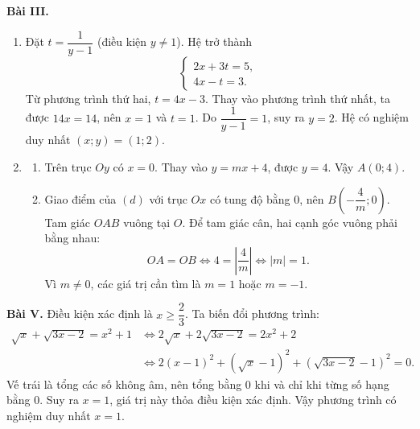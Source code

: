 \documentclass[12pt,a4paper]{article}
\begin{document}
\textbf{Bài III.}
\begin{enumerate}[label=\arabic*)]
  \item Đặt $t=\dfrac{1}{y-1}$ (điều kiện $y\ne1$). Hệ trở thành
  \[
  \begin{cases}
  2x+3t=5,\\
  4x-t=3.
  \end{cases}
  \]
  Từ phương trình thứ hai, $t=4x-3$. Thay vào phương trình thứ nhất, ta được $14x=14$, nên $x=1$ và $t=1$. Do $\dfrac{1}{y-1}=1$, suy ra $y=2$. Hệ có nghiệm duy nhất $(x;y)=(1;2)$.
  \item
  \begin{enumerate}[label=\alph*)]
    \item Trên trục $Oy$ có $x=0$. Thay vào $y=mx+4$, được $y=4$. Vậy $A(0;4)$.
    \item Giao điểm của $(d)$ với trục $Ox$ có tung độ bằng $0$, nên $B\left(-\dfrac{4}{m};0\right)$. Tam giác $OAB$ vuông tại $O$. Để tam giác cân, hai cạnh góc vuông phải bằng nhau:
    \[
    OA=OB\Longleftrightarrow 4=\left|\frac{4}{m}\right|
    \Longleftrightarrow |m|=1.
    \]
    Vì $m\ne0$, các giá trị cần tìm là $m=1$ hoặc $m=-1$.
  \end{enumerate}
\end{enumerate}

\textbf{Bài V.} Điều kiện xác định là $x\ge\dfrac{2}{3}$. Ta biến đổi phương trình:
\begin{align*}
\sqrt{x}+\sqrt{3x-2}=x^2+1
&\Longleftrightarrow 2\sqrt{x}+2\sqrt{3x-2}=2x^2+2\\
&\Longleftrightarrow 2(x-1)^2+(\sqrt{x}-1)^2+(\sqrt{3x-2}-1)^2=0.
\end{align*}
Vế trái là tổng các số không âm, nên tổng bằng $0$ khi và chỉ khi từng số hạng bằng $0$. Suy ra $x=1$, giá trị này thỏa điều kiện xác định. Vậy phương trình có nghiệm duy nhất $x=1$.
\end{document}
